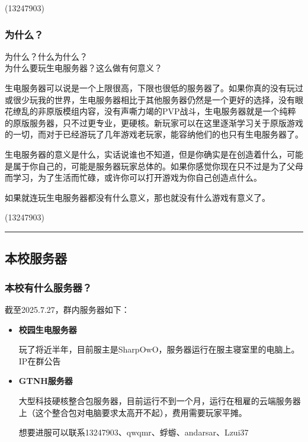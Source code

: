 \documentclass[
]{article}
\begin{document}
\begin{flushright}(13247903)\end{flushright}

\subsubsection{为什么？}\label{section-10}

为什么？什么为什么？\\
为什么要玩生电服务器？这么做有何意义？

生电服务器可以说是一个上限很高，下限也很低的服务器了。如果你真的没有玩过或很少玩我的世界，生电服务器相比于其他服务器仍然是一个更好的选择，没有眼花缭乱的非原版模组内容，没有声嘶力竭的PVP战斗，生电服务器就是一个纯粹的原版服务器，只不过更专业，更硬核。新玩家可以在这里逐渐学习关于原版游戏的一切，而对于已经游玩了几年游戏老玩家，能容纳他们的也只有生电服务器了。

生电服务器的意义是什么，实话说谁也不知道，但是你确实是在创造着什么，可能是属于你自己的，可能是服务器玩家总体的。如果你感觉你现在只不过是为了父母而学习，为了生活而忙碌，或许你可以打开游戏为你自己创造点什么。

如果就连玩生电服务器都没有什么意义，那也就没有什么游戏有意义了。

\begin{flushright}(13247903)\end{flushright}

\begin{center}\rule{0.5\linewidth}{0.5pt}\end{center}

\subsection{本校服务器}\label{section-11}

\subsubsection{本校有什么服务器？}\label{section-12}

截至2025.7.27，群内服务器如下：

\begin{itemize}
\item
  \textbf{校园生电服务器}

  玩了将近半年，目前服主是SharpOwO，服务器运行在服主寝室里的电脑上。IP在群公告
\item
  \textbf{GTNH服务器}

  大型科技硬核整合包服务器，目前运行不到一个月，运行在租雇的云端服务器上（这个整合包对电脑要求太高开不起），费用需要玩家平摊。

  想要进服可以联系13247903、qwqmr、蜉蝣、andarsar、Lzui37
\end{itemize}
\end{document}

